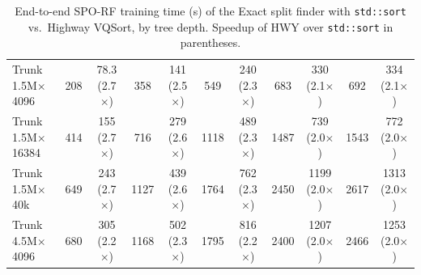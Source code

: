 \begin{table}[p]
\begin{tabular}{l|cc|cc|cc|cc|cc}
        Trunk 1.5M$\times$4096 & 208 & 78.3 (2.7$\times$) & 358 & 141 (2.5$\times$) & 549 & 240 (2.3$\times$) & 683 & 330 (2.1$\times$) & 692 & 334 (2.1$\times$) \\
        Trunk 1.5M$\times$16384 & 414 & 155 (2.7$\times$) & 716 & 279 (2.6$\times$) & 1118 & 489 (2.3$\times$) & 1487 & 739 (2.0$\times$) & 1543 & 772 (2.0$\times$) \\
        Trunk 1.5M$\times$40k & 649 & 243 (2.7$\times$) & 1127 & 439 (2.6$\times$) & 1764 & 762 (2.3$\times$) & 2450 & 1199 (2.0$\times$) & 2617 & 1313 (2.0$\times$) \\
        Trunk 4.5M$\times$4096 & 680 & 305 (2.2$\times$) & 1168 & 502 (2.3$\times$) & 1795 & 816 (2.2$\times$) & 2400 & 1207 (2.0$\times$) & 2466 & 1253 (2.0$\times$) \\
        \hline
    \end{tabular}
    \caption{End-to-end SPO-RF training time (s) of the Exact split finder with \texttt{std::sort} vs.\ Highway VQSort, by tree depth. Speedup of HWY over \texttt{std::sort} in parentheses.}
    \label{tab:stdsort-vs-highway}
\end{table}
